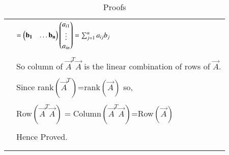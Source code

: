 \begin{longtable}{|l|l|}
	&$=\begin{pmatrix}\mathbf{b_1}&\hdots\mathbf{b_n}\end{pmatrix}\begin{pmatrix}a_{i1}\\ \vdots \\a_{in}\end{pmatrix}=\sum_{j=1}^{n}a_{ij}b_j$\\
	&\\
	&So column of $\vec{A}^T\vec{A}$ is the linear combination of rows of $\vec{A}$.\\
	&\\
	&Since rank$(\vec{A}^T)$=rank$(\vec{A})$ so,\\
	&\\
	&Row$(\vec{A}^T\vec{A})=$Column$(\vec{A}^T\vec{A})$=Row$(\vec{A})$\\
	&\\
	&Hence Proved.\\

	&\\
\hline
  
    \caption{Proofs}
    \label{eq:solutions/2015/june/71/table:1}
\end{longtable}
